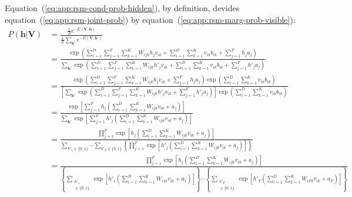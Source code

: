 Equation~(\ref{eq:app:rsm-cond-prob-hidden}), by definition, devides equation~(\ref{eq:app:rsm-joint-prob}) by equation~(\ref{eq:app:rsm-marg-prob-visible}):
\begin{align}
    \label{eq:app:rsm-cond-prob-hidden-init}
    P(\mathbf{h} | \mathbf{V}) &= \frac{\frac{1}{Z} e^{-E(\mathbf{V}, \mathbf{h})}}{\frac{1}{Z} \sum\limits_{\mathbf{h}'} e^{-E(\mathbf{V}, \mathbf{h}')}} \\ %
    &= \frac{\exp{\left( \sum\limits^{D}_{i=1} \sum\limits^{F}_{j=1} \sum\limits^{K}_{k=1} W_{ijk} h_{j} v_{ik} + \sum\limits^{D}_{i=1} \sum\limits^{K}_{k=1} v_{ik} b_{ik} + \sum\limits^{F}_{j=1} h_{j} a_{j} \right)}}{\sum\limits_{\mathbf{h}'} \exp{\left( \sum\limits^{D}_{i=1} \sum\limits^{F}_{j=1} \sum\limits^{K}_{k=1} W_{ijk} h'_{j} v_{ik} + \sum\limits^{D}_{i=1} \sum\limits^{K}_{k=1} v_{ik} b_{ik} + \sum\limits^{F}_{j=1} h'_{j} a_{j}\right)}} \nonumber \\ %
    &= \frac{\exp{\left( \sum\limits^{D}_{i=1} \sum\limits^{F}_{j=1} \sum\limits^{K}_{k=1} W_{ijk} h_{j} v_{ik} + \sum\limits^{F}_{j=1} h_{j} a_{j}\right) \exp{\left( \sum\limits^{D}_{i=1} \sum\limits^{K}_{k=1} v_{ik} b_{ik}\right)}}}{\left[ \sum\limits_{\mathbf{h}'} \exp{\left( \sum\limits^{D}_{i=1} \sum\limits^{F}_{j=1} \sum\limits^{K}_{k=1} W_{ijk} h'_{j} v_{ik} + \sum\limits^{F}_{j=1} h'_{j} a_{j}\right)}\right] \exp{\left( \sum\limits^{D}_{i=1} \sum\limits^{K}_{k=1} v_{ik} b_{ik}\right)}} \nonumber \\ %
    &= \frac{\exp{\left[ \sum\limits^{F}_{j=1} h_{j} \left( \sum\limits^{D}_{i=1} \sum\limits^{K}_{k=1} W_{ijk} v_{ik} + a_{j}\right)\right]}}{\sum\limits_{\mathbf{h}'} \exp{\left[ \sum\limits^{F}_{j=1} h'_{j} \left( \sum\limits^{D}_{i=1} \sum\limits^{K}_{k=1} W_{ijk} v_{ik} + a_{j}\right)\right]}} \nonumber \\ %
    &= \frac{\prod\limits^{F}_{j=1} \exp{\left[h_{j} \left( \sum\limits^{D}_{i=1} \sum\limits^{K}_{k=1} W_{ijk} v_{ik} + a_{j}\right)\right]}}{\sum\limits_{h'_{1} \in \{0,1\}} \cdots \sum\limits_{h'_{F} \in \{0,1\}} \left\{ \prod\limits^{F}_{j=1} \exp{\left[h'_{j} \left( \sum\limits^{D}_{i=1} \sum\limits^{K}_{k=1} W_{ijk} v_{ik} + a_{j}\right)\right]}\right\}} \nonumber \\ %
    &= \frac{\prod\limits^{F}_{j=1} \exp{\left[h_{j} \left(\sum\limits^{D}_{i=1} \sum\limits^{K}_{k=1} W_{ijk} v_{ik} + a_{j}\right)\right]}}{\left\{ \sum\limits_{\substack{h'_{1} \\ \in \{0,1\}}} \exp{\left[h'_{1} \left( \sum\limits^{D}_{i=1} \sum\limits^{K}_{k=1} W_{i1k} v_{ik} + a_{1}\right)\right]}\right\} \cdots \left\{ \sum\limits_{\substack{h'_{F} \\ \in \{0,1\}}} \exp{\left[h'_{F} \left( \sum\limits^{D}_{i=1} \sum\limits^{K}_{k=1} W_{iFk} v_{ik} + a_{F}\right)\right]}\right\}}  \nonumber \\ %

\end{align}

